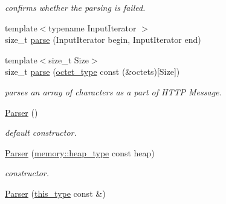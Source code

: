\begin{DoxyCompactItemize}
\begin{DoxyCompactList}\small\item\em confirms whether the parsing is failed. \end{DoxyCompactList}\item 
{\footnotesize template$<$typename Input\-Iterator $>$ }\\size\-\_\-t \hyperlink{classhryky_1_1http_1_1_parser_a8d52531e2de574b6fd00c0a378a6b9f3}{parse} (Input\-Iterator begin, Input\-Iterator end)
\item 
{\footnotesize template$<$size\-\_\-t Size$>$ }\\size\-\_\-t \hyperlink{classhryky_1_1http_1_1_parser_a877c3f5a5cb667abfceb39d2bfea0fd2}{parse} (\hyperlink{namespacehryky_a488cba8b666be33ccca70e819684e3c8}{octet\-\_\-type} const (\&octets)\mbox{[}Size\mbox{]})
\begin{DoxyCompactList}\small\item\em parses an array of characters as a part of H\-T\-T\-P Message. \end{DoxyCompactList}\item 
\hypertarget{classhryky_1_1http_1_1_parser_a479bceb82f9242148e35df6062645984}{\hyperlink{classhryky_1_1http_1_1_parser_a479bceb82f9242148e35df6062645984}{Parser} ()}\label{classhryky_1_1http_1_1_parser_a479bceb82f9242148e35df6062645984}

\begin{DoxyCompactList}\small\item\em default constructor. \end{DoxyCompactList}\item 
\hypertarget{classhryky_1_1http_1_1_parser_a5001c68e5316337c0ffcb86f145ec4f7}{\hyperlink{classhryky_1_1http_1_1_parser_a5001c68e5316337c0ffcb86f145ec4f7}{Parser} (\hyperlink{classhryky_1_1memory_1_1heap_1_1_base}{memory\-::heap\-\_\-type} const heap)}\label{classhryky_1_1http_1_1_parser_a5001c68e5316337c0ffcb86f145ec4f7}

\begin{DoxyCompactList}\small\item\em constructor. \end{DoxyCompactList}\item 
\hypertarget{classhryky_1_1http_1_1_parser_a686d36ed2158f4c30dd6a8b98a482f23}{\hyperlink{classhryky_1_1http_1_1_parser_a686d36ed2158f4c30dd6a8b98a482f23}{Parser} (\hyperlink{classhryky_1_1http_1_1_parser_ad7998597a6ec4d6f9e672e8c4974b117}{this\-\_\-type} const \&)}\label{classhryky_1_1http_1_1_parser_a686d36ed2158f4c30dd6a8b98a482f23}


\end{DoxyCompactItemize}
